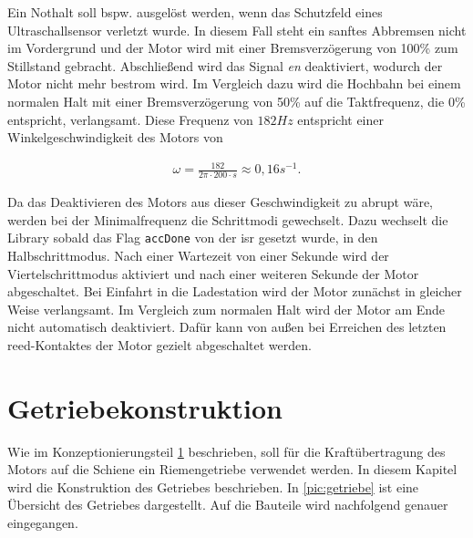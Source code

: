 Ein Nothalt soll bspw. ausgelöst werden, wenn das Schutzfeld eines Ultraschallsensor verletzt wurde. In diesem Fall steht ein sanftes Abbremsen nicht im Vordergrund und der Motor wird mit einer Bremsverzögerung von 100\% zum Stillstand gebracht. Abschließend wird das Signal \textit{en} deaktiviert, wodurch der Motor nicht mehr bestrom wird. Im Vergleich dazu wird die Hochbahn bei einem normalen Halt mit einer Bremsverzögerung von 50\% auf die Taktfrequenz, die 0\% entspricht, verlangsamt. Diese Frequenz von $182 Hz$ entspricht einer Winkelgeschwindigkeit des Motors von 

\begin{align}
	\omega = \frac{182}{2\pi \cdot 200 \cdot s}  \approx 0,16 s^{-1}.
\end{align}

Da das Deaktivieren des Motors aus dieser Geschwindigkeit zu abrupt wäre, werden bei der Minimalfrequenz die Schrittmodi gewechselt. Dazu wechselt die Library sobald  das Flag \texttt{accDone} von der \acrshort{isr} gesetzt wurde, in den Halbschrittmodus. Nach einer Wartezeit von einer Sekunde wird der Viertelschrittmodus aktiviert und nach einer weiteren Sekunde der Motor abgeschaltet. Bei Einfahrt in die Ladestation wird der Motor zunächst in gleicher Weise verlangsamt. Im Vergleich zum normalen Halt wird der Motor am Ende nicht automatisch deaktiviert. Dafür kann von außen bei Erreichen des letzten \acrshort{reed}-Kontaktes der Motor gezielt abgeschaltet werden. 

\section{Getriebekonstruktion}
\label{sec:getriebekonstruktion}
Wie im Konzeptionierungsteil \ref{sec:getriebekonstruktion} beschrieben, soll für die Kraftübertragung des Motors auf die Schiene ein Riemengetriebe verwendet werden. In diesem Kapitel wird die Konstruktion des Getriebes beschrieben. In \autoref{pic:getriebe} ist eine Übersicht des Getriebes dargestellt. Auf die Bauteile wird nachfolgend genauer eingegangen. 

